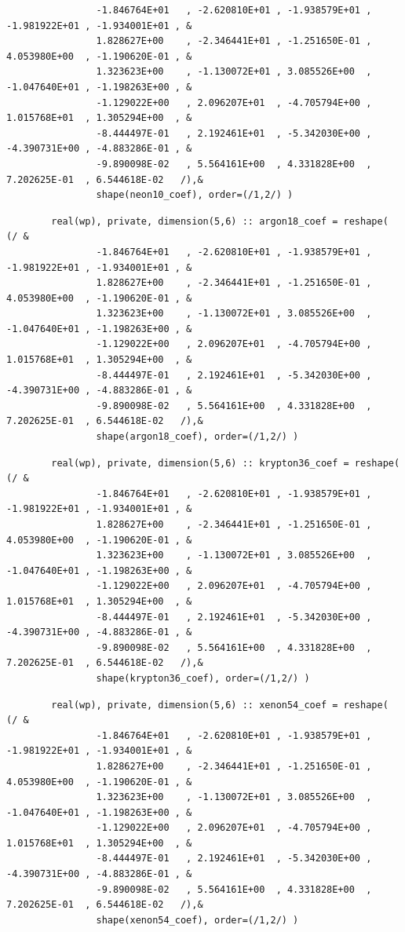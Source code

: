 \documentclass[amsmath,amssymb,a4]{revtex4-2}
\begin{document}
\begin{small}
\begin{verbatim}
                -1.846764E+01	, -2.620810E+01	, -1.938579E+01	, -1.981922E+01	, -1.934001E+01	, & 
                1.828627E+00	, -2.346441E+01	, -1.251650E-01	, 4.053980E+00	, -1.190620E-01	, & 
                1.323623E+00	, -1.130072E+01	, 3.085526E+00	, -1.047640E+01	, -1.198263E+00	, & 
                -1.129022E+00	, 2.096207E+01	, -4.705794E+00	, 1.015768E+01	, 1.305294E+00	, & 
                -8.444497E-01	, 2.192461E+01	, -5.342030E+00	, -4.390731E+00	, -4.883286E-01	, & 
                -9.890098E-02	, 5.564161E+00	, 4.331828E+00	, 7.202625E-01	, 6.544618E-02	 /),& 
                shape(neon10_coef), order=(/1,2/) ) 
    \end{verbatim}
   \begin{verbatim}
        real(wp), private, dimension(5,6) :: argon18_coef = reshape( (/ & 
                -1.846764E+01	, -2.620810E+01	, -1.938579E+01	, -1.981922E+01	, -1.934001E+01	, & 
                1.828627E+00	, -2.346441E+01	, -1.251650E-01	, 4.053980E+00	, -1.190620E-01	, & 
                1.323623E+00	, -1.130072E+01	, 3.085526E+00	, -1.047640E+01	, -1.198263E+00	, & 
                -1.129022E+00	, 2.096207E+01	, -4.705794E+00	, 1.015768E+01	, 1.305294E+00	, & 
                -8.444497E-01	, 2.192461E+01	, -5.342030E+00	, -4.390731E+00	, -4.883286E-01	, & 
                -9.890098E-02	, 5.564161E+00	, 4.331828E+00	, 7.202625E-01	, 6.544618E-02	 /),& 
                shape(argon18_coef), order=(/1,2/) ) 
    \end{verbatim}
       \begin{verbatim}
        real(wp), private, dimension(5,6) :: krypton36_coef = reshape( (/ & 
                -1.846764E+01	, -2.620810E+01	, -1.938579E+01	, -1.981922E+01	, -1.934001E+01	, & 
                1.828627E+00	, -2.346441E+01	, -1.251650E-01	, 4.053980E+00	, -1.190620E-01	, & 
                1.323623E+00	, -1.130072E+01	, 3.085526E+00	, -1.047640E+01	, -1.198263E+00	, & 
                -1.129022E+00	, 2.096207E+01	, -4.705794E+00	, 1.015768E+01	, 1.305294E+00	, & 
                -8.444497E-01	, 2.192461E+01	, -5.342030E+00	, -4.390731E+00	, -4.883286E-01	, & 
                -9.890098E-02	, 5.564161E+00	, 4.331828E+00	, 7.202625E-01	, 6.544618E-02	 /),& 
                shape(krypton36_coef), order=(/1,2/) ) 
    \end{verbatim}
    \begin{verbatim}
        real(wp), private, dimension(5,6) :: xenon54_coef = reshape( (/ & 
                -1.846764E+01	, -2.620810E+01	, -1.938579E+01	, -1.981922E+01	, -1.934001E+01	, & 
                1.828627E+00	, -2.346441E+01	, -1.251650E-01	, 4.053980E+00	, -1.190620E-01	, & 
                1.323623E+00	, -1.130072E+01	, 3.085526E+00	, -1.047640E+01	, -1.198263E+00	, & 
                -1.129022E+00	, 2.096207E+01	, -4.705794E+00	, 1.015768E+01	, 1.305294E+00	, & 
                -8.444497E-01	, 2.192461E+01	, -5.342030E+00	, -4.390731E+00	, -4.883286E-01	, & 
                -9.890098E-02	, 5.564161E+00	, 4.331828E+00	, 7.202625E-01	, 6.544618E-02	 /),& 
                shape(xenon54_coef), order=(/1,2/) ) 
    \end{verbatim}
\end{small}
\end{document}

